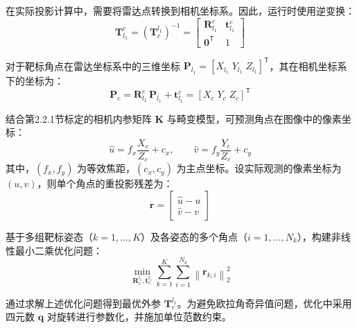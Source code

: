 在实际投影计算中，需要将雷达点转换到相机坐标系。因此，运行时使用逆变换：
\begin{equation}
\label{eq:LiDAR_to_cam_tf_inverse}
\mathbf{T}_{l_1}^{c}=\left(\mathbf{T}_{c}^{l_1}\right)^{-1}=
\begin{bmatrix}
\mathbf{R}_{l_1}^{c} & \mathbf{t}_{l_1}^{c}\\
\mathbf{0}^{\mathsf{T}} & 1
\end{bmatrix}
\end{equation}

对于靶标角点在雷达坐标系中的三维坐标 $\mathbf{P}_{l_1}=[X_{l_1}\;Y_{l_1}\;Z_{l_1}]^{\mathsf{T}}$，其在相机坐标系下的坐标为：
\begin{equation}
\label{eq:LiDAR_to_cam}
\mathbf{P}_{c}=\mathbf{R}_{l_1}^{c}\,\mathbf{P}_{l_1}+\mathbf{t}_{l_1}^{c}=[X_c\;Y_c\;Z_c]^{\mathsf{T}}
\end{equation}

结合第2.2.1节标定的相机内参矩阵 $\mathbf{K}$ 与畸变模型，可预测角点在图像中的像素坐标：
\begin{equation}
\label{eq:LiDAR_cam_project}
\hat{u}=f_x\frac{X_c}{Z_c}+c_x,\qquad
\hat{v}=f_y\frac{Y_c}{Z_c}+c_y
\end{equation}
其中，$(f_x, f_y)$ 为等效焦距，$(c_x, c_y)$ 为主点坐标。设实际观测的像素坐标为 $(u,v)$，则单个角点的重投影残差为：
\begin{equation}
\label{eq:reproj_residual_uv}
\mathbf{r}=\begin{bmatrix}\hat{u}-u\\\hat{v}-v\end{bmatrix}
\end{equation}

基于多组靶标姿态（$k=1,\dots,K$）及各姿态的多个角点（$i=1,\dots,N_k$），构建非线性最小二乘优化问题：
\begin{equation}
\label{eq:cam_LiDAR_cost}
\displaystyle\min_{\mathbf{R}_{c}^{l_1},\mathbf{t}_{c}^{l_1}}\sum_{k=1}^{K}\sum_{i=1}^{N_k}\left\lVert \mathbf{r}_{k,i}\right\rVert_2^2
\end{equation}

通过求解上述优化问题得到最优外参 $\mathbf{T}_{c}^{l_1}$。为避免欧拉角奇异值问题，优化中采用四元数 $\mathbf{q}$ 对旋转进行参数化，并施加单位范数约束。

